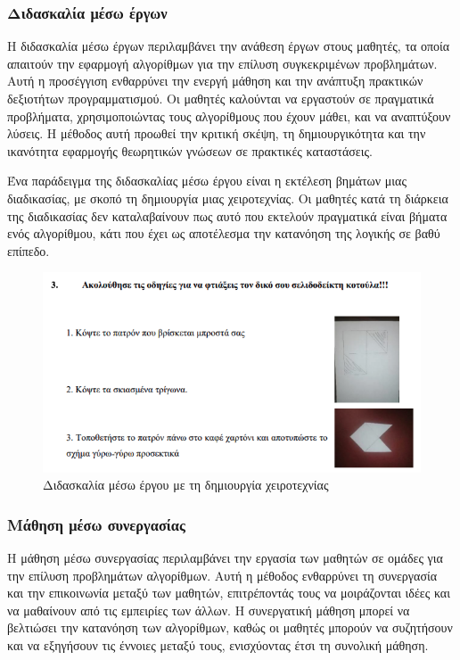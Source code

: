 \subsubsection{Διδασκαλία μέσω έργων}

Η διδασκαλία μέσω έργων περιλαμβάνει την ανάθεση έργων στους μαθητές, τα οποία απαιτούν την εφαρμογή αλγορίθμων για την επίλυση συγκεκριμένων προβλημάτων. Αυτή η προσέγγιση ενθαρρύνει την ενεργή μάθηση και την ανάπτυξη πρακτικών δεξιοτήτων προγραμματισμού. Οι μαθητές καλούνται να εργαστούν σε πραγματικά προβλήματα, χρησιμοποιώντας τους αλγορίθμους που έχουν μάθει, και να αναπτύξουν λύσεις. Η μέθοδος αυτή προωθεί την κριτική σκέψη, τη δημιουργικότητα και την ικανότητα εφαρμογής θεωρητικών γνώσεων σε πρακτικές καταστάσεις\cite{bodner_role_1987}.

Ένα παράδειγμα της διδασκαλίας μέσω έργου είναι η εκτέλεση βημάτων μιας διαδικασίας, με σκοπό τη δημιουργία μιας χειροτεχνίας. Οι μαθητές κατά τη διάρκεια της διαδικασίας δεν καταλαβαίνουν πως αυτό που εκτελούν πραγματικά είναι βήματα ενός αλγορίθμου, κάτι που έχει ως αποτέλεσμα την κατανόηση της λογικής σε βαθύ επίπεδο\cite{__2022}.

\begin{figure}[H]
    \centering
    \includegraphics[width=0.8\linewidth]{sections/2/images/chicken}
    \caption{Διδασκαλία μέσω έργου με τη δημιουργία χειροτεχνίας}
    \label{fig:cicken}
\end{figure}

\subsubsection{Μάθηση μέσω συνεργασίας}

Η μάθηση μέσω συνεργασίας περιλαμβάνει την εργασία των μαθητών σε ομάδες για την επίλυση προβλημάτων αλγορίθμων. Αυτή η μέθοδος ενθαρρύνει τη συνεργασία και την επικοινωνία μεταξύ των μαθητών, επιτρέποντάς τους να μοιράζονται ιδέες και να μαθαίνουν από τις εμπειρίες των άλλων. Η συνεργατική μάθηση μπορεί να βελτιώσει την κατανόηση των αλγορίθμων, καθώς οι μαθητές μπορούν να συζητήσουν και να εξηγήσουν τις έννοιες μεταξύ τους, ενισχύοντας έτσι τη συνολική μάθηση\cite{crepinsek_note_2012}.

